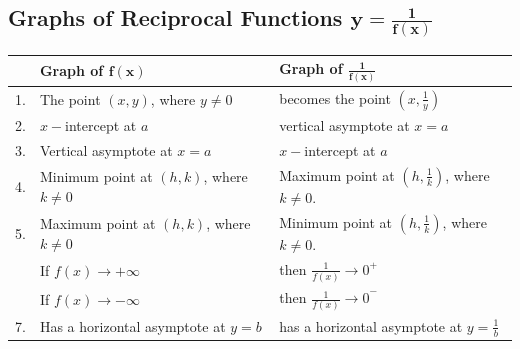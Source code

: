 \documentclass[11pt,a4paper]{book}
\begin{document}
\subsection{Graphs of Reciprocal Functions $\boldsymbol{y=\frac{1}{f\left(x\right)}}$}
\begin{center}
\begin{tcolorbox}[colback=blue!5, colframe=black,boxrule=.4pt, sharpish corners]

\setlength{\extrarowheight}{5pt}
\begin{center}
\begin{tabular}{>{\raggedright}m{0.5cm}|>{\centering}m{6.5cm}|>{\centering}m{6.5cm}}
 & \textbf{Graph of }$\boldsymbol{f(x)}$ & \textbf{Graph of }${\displaystyle \boldsymbol{\frac{1}{f\left(x\right)}}}$\tabularnewline
\hline
1. & The point $\left(x,y\right)$, where $y\neq0$ & becomes the point ${\displaystyle \left(x,\frac{1}{y}\right)}$\tabularnewline
\hline
2. & $x-$intercept at $a$ & vertical asymptote at $x=a$\tabularnewline
\hline
3. & Vertical asymptote at $x=a$ & $x-$intercept at $a$\tabularnewline
\hline
4. & Minimum point at $\left(h,k\right)$, where $k\neq0$  & Maximum point at ${\displaystyle \left(h,\frac{1}{k}\right)}$, where
$k\neq0$.\tabularnewline
\hline
5. & Maximum point at $\left(h,k\right)$, where $k\neq0$ &

Minimum point at ${\displaystyle \left(h,\frac{1}{k}\right)}$, where
$k\neq0$.\tabularnewline
\hline
\multirow{2}{0.5cm}{\bigskip6.} & \medskip

If $f\left(x\right)\rightarrow+\infty$

\medskip & \medskip

then ${\displaystyle \frac{1}{f\left(x\right)}\rightarrow0^{+}}$

\medskip\tabularnewline
 & If $f\left(x\right)\rightarrow-\infty$

\medskip & then ${\displaystyle \frac{1}{f\left(x\right)}\rightarrow0}^{-}$

\medskip\tabularnewline
\hline
7. & Has a horizontal asymptote at $y=b$ & has a horizontal asymptote at ${\displaystyle y=\frac{1}{b}}$\tabularnewline
\end{tabular}
\par\end{center}
\end{tcolorbox}
\par\end{center}
\end{document}
